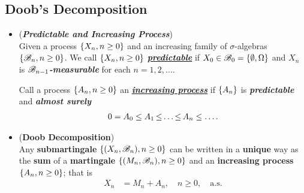 \documentclass[11pt]{article}
\begin{document}
\subsection{Doob's Decomposition}
\begin{itemize}
\item \begin{definition}(\textbf{\emph{Predictable and Increasing Process}}) \\
Given a process $\left\{X_n, n \ge 0\right\}$ and an increasing family of $\sigma$-algebras $\left\{{\mathscr B}_n, n \ge 0\right\}$. We call $\left\{X_n, n \ge 0\right\}$ \underline{\emph{\textbf{predictable}}} if $X_0 \in {\mathscr B}_0 =  \left\{\emptyset, \Omega\right\}$ and  $X_n$ is \emph{\textbf{${\mathscr B}_{n-1}$-measurable}} for each $n =1, 2, \ldots$.

Call a process $\left\{A_n, n \ge 0\right\}$ an \underline{\emph{\textbf{increasing process}}} if $\left\{A_n\right\}$ is \emph{\textbf{predictable}} and \emph{\textbf{almost
surely}} 
\begin{align*}
 0 = A_0 \le A_1 \,{\le}\ldots{\le}\, A_n \le \ldots.
\end{align*}
\end{definition}

\item \begin{theorem} (\textbf{Doob Decomposition}) \citep{billingsley2008probability, resnick2013probability}\\
Any \textbf{submartingale} $\left\{(X_n, {\mathscr B}_n), n \ge 0\right\}$ can be written in a \textbf{unique} way as the \textbf{sum} of a \textbf{martingale} $\left\{(M_n, {\mathscr B}_n), n \ge 0\right\}$ and an \textbf{increasing process} $\left\{A_n, n \ge 0\right\}$; that is
\begin{align*}
X_n &= M_n + A_n, \quad n\ge 0, \quad \text{a.s.}
\end{align*}
\end{theorem}
\end{itemize}
\end{document}
